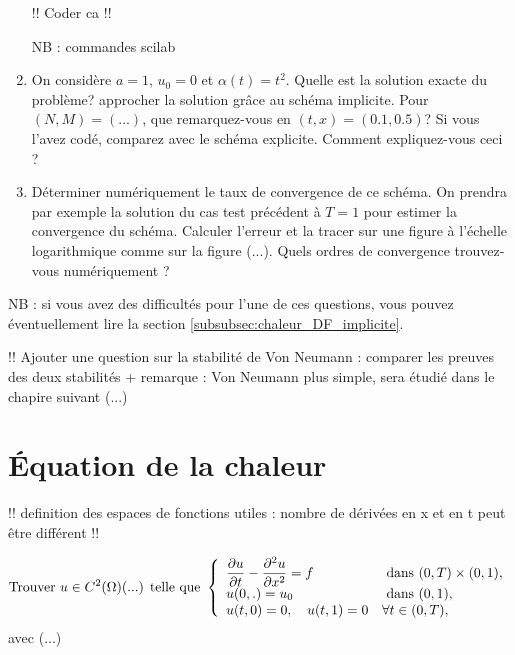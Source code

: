 \documentclass[12pt,a4paper,twoside]{article}
\begin{document}
\begin{exercise}
\begin{enumerate}
    !! Coder ca !!

    NB : commandes scilab


  \item On consid\`ere $a=1$, $u_0 = 0$ et $\alpha(t) = t^2$.
    Quelle est la solution exacte du probl\`eme?
    approcher la solution gr\^ace au sch\'ema implicite.
    Pour $(N,M) = (...)$, que remarquez-vous en $(t,x)=(0.1,0.5)$?
    Si vous l'avez cod\'e, comparez avec le sch\'ema explicite.
    Comment expliquez-vous ceci ?
    
  \item D\'eterminer num\'eriquement le taux de convergence de ce sch\'ema.
    On prendra par exemple la solution du cas test pr\'ec\'edent \`a $T=1$ pour
    estimer la convergence du sch\'ema. Calculer l'erreur et la tracer sur une figure
    \`a l'\'echelle logarithmique comme sur la figure (...).
    Quels ordres de convergence trouvez-vous num\'eriquement ?
  \end{enumerate}
  
  NB : si vous avez des difficult\'es pour l'une de ces questions, vous pouvez \'eventuellement
  lire la section \ref{subsubsec:chaleur_DF_implicite}.

  !! Ajouter une question sur la stabilit\'e de Von Neumann : comparer les preuves des deux stabilit\'es + remarque : Von Neumann plus simple, sera \'etudi\'e dans le chapire suivant (...)
\end{exercise}


\section{\'Equation de la chaleur}

!! definition des espaces de fonctions utiles : nombre de d\'eriv\'ees en x et en t
peut \^etre diff\'erent !!

\begin{equation}
  \label{eq:chaleur_Dir}
  \text{Trouver $u \in C^2(\Omega)$(...) telle que  }
  \left\{
    \begin{array}{l l}
      \dfrac{\partial u}{\partial t} - \dfrac{\partial^2 u}{\partial x^2} = f 
      &\text{ dans } (0,T) \times (0,1) ,
      \\
      u(0,.) = u_0 
      & \text{ dans } (0,1) ,
      \\
      u(t,0) = 0 , \quad u(t,1) = 0 & \forall t \in (0,T) ,
    \end{array}
  \right.
\end{equation}
avec (...)
\end{document}
